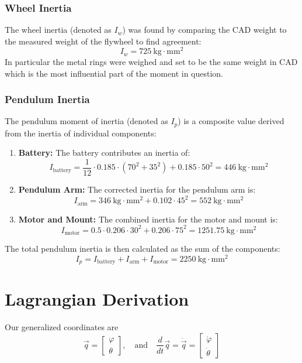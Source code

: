 \documentclass[11pt]{article}
\begin{document}
\subsubsection{Wheel Inertia}
The wheel inertia (denoted as \( I_w \)) was found by comparing the CAD weight to the measured weight of the flywheel to find agreement:
\[
I_w = 725\ \text{kg}\cdot\text{mm}^2
\]
In particular the metal rings were weighed and set to be the same weight in CAD which is the most influential part of the moment in question.

\subsubsection{Pendulum Inertia}
The pendulum moment of inertia (denoted as \( I_p \)) is a composite value derived from the inertia of individual components:

\begin{enumerate}
    \item \textbf{Battery:} The battery contributes an inertia of:
    \[
    I_{\text{battery}} = \frac{1}{12} \cdot 0.185 \cdot (70^2 + 35^2) + 0.185 \cdot 50^2 = 446\ \text{kg}\cdot\text{mm}^2
    \]
    
    \item \textbf{Pendulum Arm:} The corrected inertia for the pendulum arm is:
    \[
    I_{\text{arm}} = 346\ \text{kg}\cdot\text{mm}^2 + 0.102 \cdot 45^2 = 552\ \text{kg}\cdot\text{mm}^2
    \]
    
    \item \textbf{Motor and Mount:} The combined inertia for the motor and mount is:
    \[
    I_{\text{motor}} = 0.5 \cdot 0.206 \cdot 30^2 + 0.206 \cdot 75^2 = 1251.75\ \text{kg}\cdot\text{mm}^2
    \]
\end{enumerate}

The total pendulum inertia is then calculated as the sum of the components:
\[
I_p = I_{\text{battery}} + I_{\text{arm}} + I_{\text{motor}} = 2250\ \text{kg}\cdot\text{mm}^2
\]

\section{Lagrangian Derivation}

Our generalized coordinates are 
\[
\vec{q} = \begin{bmatrix}
    \varphi \\[0.3em] \theta
\end{bmatrix}, \quad \text{and} \quad \frac{d}{dt}\vec{q} = \dot{\vec{q}} = \begin{bmatrix}
    \dot{\varphi} \\[0.3em] \dot{\theta}
\end{bmatrix}
\]
\end{document}
